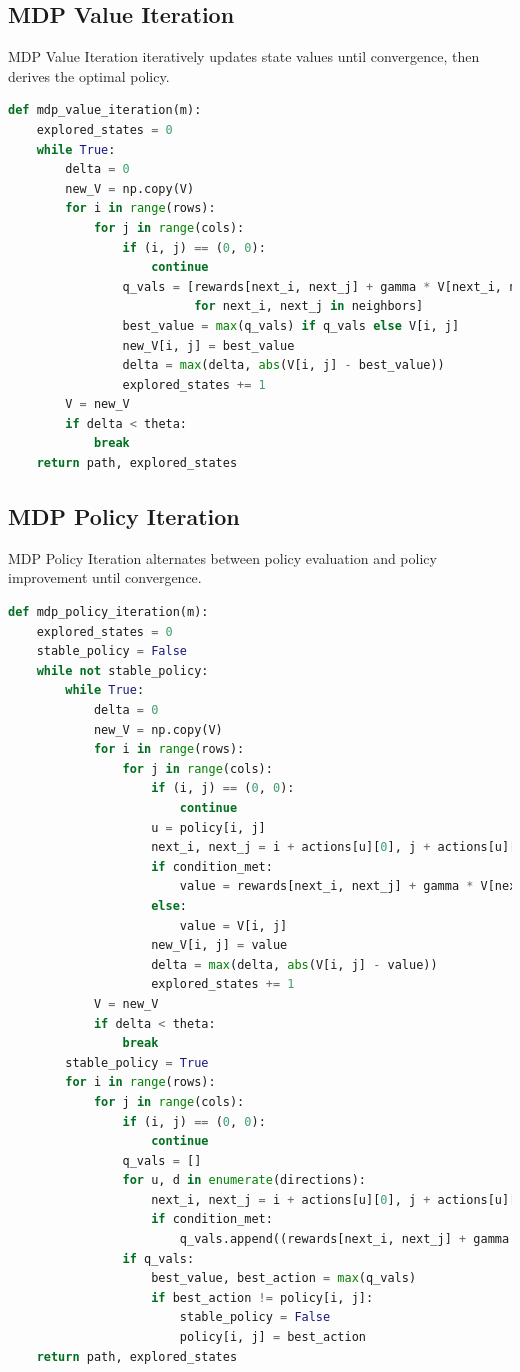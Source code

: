 \documentclass{article}
\begin{document}
\subsection{MDP Value Iteration}
MDP Value Iteration iteratively updates state values until convergence, then derives the optimal policy.

\begin{lstlisting}[language=Python, caption=MDP Value Iteration Implementation]
def mdp_value_iteration(m):
    explored_states = 0
    while True:
        delta = 0
        new_V = np.copy(V)
        for i in range(rows):
            for j in range(cols):
                if (i, j) == (0, 0):
                    continue
                q_vals = [rewards[next_i, next_j] + gamma * V[next_i, next_j] 
                          for next_i, next_j in neighbors]
                best_value = max(q_vals) if q_vals else V[i, j]
                new_V[i, j] = best_value
                delta = max(delta, abs(V[i, j] - best_value))
                explored_states += 1
        V = new_V
        if delta < theta:
            break
    return path, explored_states
\end{lstlisting}

\subsection{MDP Policy Iteration}
MDP Policy Iteration alternates between policy evaluation and policy improvement until convergence.

\begin{lstlisting}[language=Python, caption=MDP Policy Iteration Implementation]
def mdp_policy_iteration(m):
    explored_states = 0
    stable_policy = False
    while not stable_policy:
        while True:
            delta = 0
            new_V = np.copy(V)
            for i in range(rows):
                for j in range(cols):
                    if (i, j) == (0, 0):
                        continue
                    u = policy[i, j]
                    next_i, next_j = i + actions[u][0], j + actions[u][1]
                    if condition_met:
                        value = rewards[next_i, next_j] + gamma * V[next_i, next_j]
                    else:
                        value = V[i, j]
                    new_V[i, j] = value
                    delta = max(delta, abs(V[i, j] - value))
                    explored_states += 1
            V = new_V
            if delta < theta:
                break
        stable_policy = True
        for i in range(rows):
            for j in range(cols):
                if (i, j) == (0, 0):
                    continue
                q_vals = []
                for u, d in enumerate(directions):
                    next_i, next_j = i + actions[u][0], j + actions[u][1]
                    if condition_met:
                        q_vals.append((rewards[next_i, next_j] + gamma * V[next_i, next_j], u))
                if q_vals:
                    best_value, best_action = max(q_vals)
                    if best_action != policy[i, j]:
                        stable_policy = False
                        policy[i, j] = best_action
    return path, explored_states
\end{lstlisting}
\end{document}
